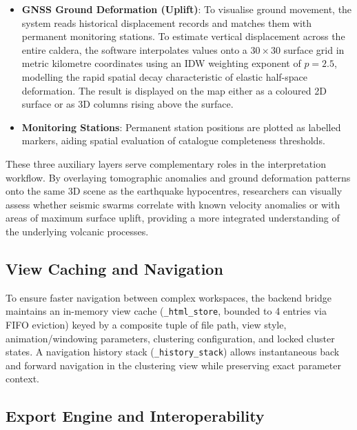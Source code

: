 \begin{itemize}
    \item \textbf{GNSS Ground Deformation (Uplift)}: To visualise ground movement, the system reads historical displacement records and matches them with permanent monitoring stations. To estimate vertical displacement across the entire caldera, the software interpolates values onto a $30 \times 30$ surface grid in metric kilometre coordinates using an IDW weighting exponent of $p=2.5$, modelling the rapid spatial decay characteristic of elastic half-space deformation. The result is displayed on the map either as a coloured 2D surface or as 3D columns rising above the surface.
    \item \textbf{Monitoring Stations}: Permanent station positions are plotted as labelled markers, aiding spatial evaluation of catalogue completeness thresholds.
\end{itemize}

These three auxiliary layers serve complementary roles in the interpretation workflow. By overlaying tomographic anomalies and ground deformation patterns onto the same 3D scene as the earthquake hypocentres, researchers can visually assess whether seismic swarms correlate with known velocity anomalies or with areas of maximum surface uplift, providing a more integrated understanding of the underlying volcanic processes.

\subsection{View Caching and Navigation}
\label{sec:view-caching}

To ensure faster navigation between complex workspaces, the backend bridge maintains an in-memory view cache (\texttt{\_html\_store}, bounded to 4 entries via FIFO eviction) keyed by a composite tuple of file path, view style, animation/windowing parameters, clustering configuration, and locked cluster states. A navigation history stack (\texttt{\_history\_stack}) allows instantaneous back and forward navigation in the clustering view while preserving exact parameter context.

\subsection{Export Engine and Interoperability}
\label{sec:export}

